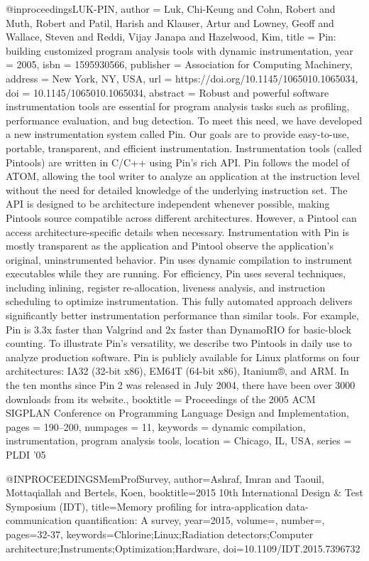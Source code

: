 {@inproceedings{LUK-PIN,
author = {Luk, Chi-Keung and Cohn, Robert and Muth, Robert and Patil, Harish and Klauser, Artur and Lowney, Geoff and Wallace, Steven and Reddi, Vijay Janapa and Hazelwood, Kim},
title = {Pin: building customized program analysis tools with dynamic instrumentation},
year = {2005},
isbn = {1595930566},
publisher = {Association for Computing Machinery},
address = {New York, NY, USA},
url = {https://doi.org/10.1145/1065010.1065034},
doi = {10.1145/1065010.1065034},
abstract = {Robust and powerful software instrumentation tools are essential for program analysis tasks such as profiling, performance evaluation, and bug detection. To meet this need, we have developed a new instrumentation system called Pin. Our goals are to provide easy-to-use, portable, transparent, and efficient instrumentation. Instrumentation tools (called Pintools) are written in C/C++ using Pin's rich API. Pin follows the model of ATOM, allowing the tool writer to analyze an application at the instruction level without the need for detailed knowledge of the underlying instruction set. The API is designed to be architecture independent whenever possible, making Pintools source compatible across different architectures. However, a Pintool can access architecture-specific details when necessary. Instrumentation with Pin is mostly transparent as the application and Pintool observe the application's original, uninstrumented behavior. Pin uses dynamic compilation to instrument executables while they are running. For efficiency, Pin uses several techniques, including inlining, register re-allocation, liveness analysis, and instruction scheduling to optimize instrumentation. This fully automated approach delivers significantly better instrumentation performance than similar tools. For example, Pin is 3.3x faster than Valgrind and 2x faster than DynamoRIO for basic-block counting. To illustrate Pin's versatility, we describe two Pintools in daily use to analyze production software. Pin is publicly available for Linux platforms on four architectures: IA32 (32-bit x86), EM64T (64-bit x86), Itanium®, and ARM. In the ten months since Pin 2 was released in July 2004, there have been over 3000 downloads from its website.},
booktitle = {Proceedings of the 2005 ACM SIGPLAN Conference on Programming Language Design and Implementation},
pages = {190–200},
numpages = {11},
keywords = {dynamic compilation, instrumentation, program analysis tools},
location = {Chicago, IL, USA},
series = {PLDI '05}
}


@INPROCEEDINGS{MemProfSurvey,
  author={Ashraf, Imran and Taouil, Mottaqiallah and Bertels, Koen},
  booktitle={2015 10th International Design & Test Symposium (IDT)}, 
  title={Memory profiling for intra-application data-communication quantification: A survey}, 
  year={2015},
  volume={},
  number={},
  pages={32-37},
  keywords={Chlorine;Linux;Radiation detectors;Computer architecture;Instruments;Optimization;Hardware},
  doi={10.1109/IDT.2015.7396732}}

}
